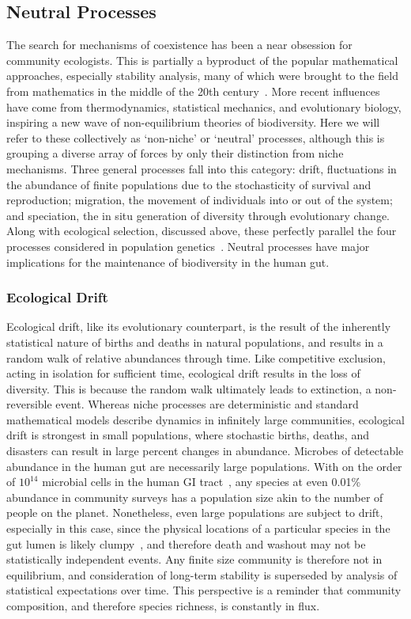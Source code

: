 \documentclass[12pt]{article}
\begin{document}
\subsection{Neutral Processes}
The search for mechanisms of coexistence has been a near obsession for
community ecologists.
This is partially a byproduct of the popular mathematical approaches,
especially stability analysis,
many of which were brought to the field from mathematics
in the middle of the 20th century~\citep[e.g\@.][]{May1973,MacArthurTODO}.
More recent influences have come from thermodynamics,
statistical mechanics, and evolutionary biology,
inspiring a new wave of non-equilibrium theories of biodiversity.
Here we will refer to these collectively as `non-niche' or `neutral'
processes,
although this is grouping a diverse array of forces by only their
distinction from niche mechanisms.
Three general processes fall into this category:
drift, fluctuations in the abundance of finite populations due to
the stochasticity of survival and reproduction;
migration, the movement of individuals into or out of the system;
and speciation, the in situ generation of diversity through
evolutionary change.
Along with ecological selection, discussed above,
these perfectly parallel the four processes considered in population
genetics~\citep{Vellend2010}.
Neutral processes have major implications for the maintenance of
biodiversity in the human gut.

\subsubsection{Ecological Drift}
Ecological drift, like its evolutionary counterpart, is the result
of the inherently statistical nature of births and deaths in
natural populations, and results in a random walk of
relative abundances through time.
Like competitive exclusion, acting in isolation for
sufficient time,
ecological drift results in the loss of diversity.
This is because the random walk ultimately
leads to extinction, a non-reversible event.
Whereas niche processes are deterministic and standard mathematical
models describe dynamics in infinitely large communities,
ecological drift is strongest in small populations, where
stochastic births, deaths, and disasters can result in large
percent changes in abundance.
Microbes of detectable abundance in the human gut are necessarily
large populations.
With on the order of \(10^{14}\) microbial cells in the human GI tract~\citep{TODO},
any species at even 0.01\% abundance in community surveys
has a population size akin to the number of people on the planet.
Nonetheless, even large populations are subject to drift,
especially in this case,
since the physical locations of a particular species in
the gut lumen is likely clumpy~\citep{TODO}, and therefore death and washout
may not be statistically independent events.
Any finite size community is therefore not in equilibrium,
and consideration of long-term stability is superseded by
analysis of statistical expectations over time.
This perspective is a reminder that community composition,
and therefore species richness, is constantly in flux.
\end{document}
